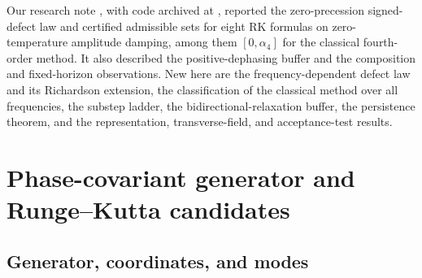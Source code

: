\documentclass[pdflatex,sn-mathphys-num]{sn-jnl}
\theoremstyle{thmstyleone}
\theoremstyle{thmstylethree}
\theoremstyle{thmstyletwo}
\begin{document}
Our research note \cite{PierpointBernardLiu2026Note}, with code archived at \cite{PierpointBernardLiu2026Zenodo}, reported the zero-precession signed-defect law and certified admissible sets for eight RK formulas on zero-temperature amplitude damping, among them $[0,\alpha_4]$ for the classical fourth-order method. It also described the positive-dephasing buffer and the composition and fixed-horizon observations. New here are the frequency-dependent defect law and its Richardson extension, the classification of the classical method over all frequencies, the substep ladder, the bidirectional-relaxation buffer, the persistence theorem, and the representation, transverse-field, and acceptance-test results.
\section{Phase-covariant generator and Runge--Kutta candidates}\label{sec:problem}

\subsection{Generator, coordinates, and modes}\label{sec:generator}
\end{document}
